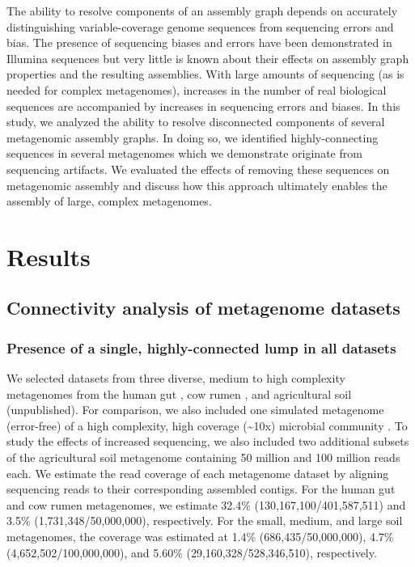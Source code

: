 \documentclass[11pt]{article} %
\begin{document}
The ability to resolve components of an assembly graph depends on accurately distinguishing variable-coverage genome sequences from sequencing errors and bias.  The presence of sequencing biases and errors have been demonstrated in Illumina sequences \cite{Harismendy:2009p228,Hoffmann:2009p1027,Nakamura:2011p741} but very little is known about their effects on assembly graph properties and the resulting assemblies.  With large amounts of sequencing (as is needed for complex metagenomes), increases in the number of real biological sequences are accompanied by increases in sequencing errors and biases.  In this study, we analyzed the ability to resolve disconnected components of several metagenomic assembly graphs.  In doing so, we identified highly-connecting sequences in several metagenomes which we demonstrate originate from sequencing artifacts.  We evaluated the effects of removing these sequences on metagenomic assembly and discuss how this approach ultimately enables the assembly of large, complex metagenomes.  

\section{Results}

\subsection{Connectivity analysis of metagenome datasets}

\subsubsection{Presence of a single, highly-connected lump in all datasets}
We selected datasets from three diverse, medium to high complexity metagenomes from the human gut \cite{Qin:2010p189}, cow rumen \cite{Hess:2011p686}, and agricultural soil (unpublished). For comparison, we also included one simulated metagenome (error-free) of a high complexity, high coverage (\textasciitilde{}10x) microbial community \cite{Pignatelli:2011p742}. To study the effects of increased sequencing, we also included two additional subsets of the agricultural soil metagenome containing 50 million and 100 million reads each.   We estimate the read coverage of each metagenome dataset by aligning sequencing reads to their corresponding assembled contigs.  For the human gut and cow rumen metagenomes, we estimate 32.4\% (130,167,100/401,587,511) and 3.5\% (1,731,348/50,000,000), respectively.  For the small, medium, and large soil metagenomes, the coverage was estimated at 1.4\% (686,435/50,000,000), 4.7\% (4,652,502/100,000,000), and 5.60\% (29,160,328/528,346,510), respectively.
\end{document}
